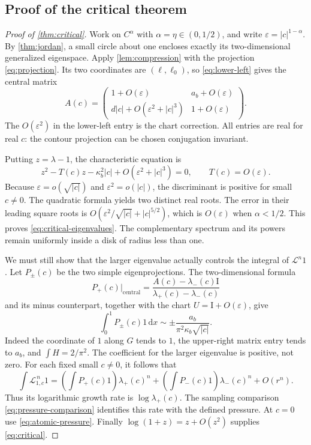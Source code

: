 \documentclass[11pt,a4paper]{article}
\numberwithin{equation}{section}
\theoremstyle{definition}
\theoremstyle{remark}
\newcommand{\dd}{\,\mathrm d}
\newcommand{\Lop}{\mathcal L}
\newcommand{\Id}{\mathrm I}
\begin{document}
\subsection{Proof of the critical theorem}
\begin{proof}[Proof of \cref{thm:critical}]
Work on $C^\alpha$ with $\alpha=\eta\in(0,1/2)$, and write
$\varepsilon=|c|^{1-\alpha}$.
By \cref{thm:jordan}, a small circle about one encloses exactly its
two-dimensional generalized eigenspace. Apply \cref{lem:compression}
with the projection \cref{eq:projection}. Its two coordinates are
$(\ell,\ell_0)$, so \cref{eq:lower-left} gives the central matrix
\begin{equation}
 A(c)=
 \begin{pmatrix}
 1+O(\varepsilon)&a_b+O(\varepsilon)\\
 d|c|+O(\varepsilon^2+|c|^3)&1+O(\varepsilon)
 \end{pmatrix}.
 \label{eq:critical-matrix}
\end{equation}
The $O(\varepsilon^2)$ in the lower-left entry is the chart correction.
All entries are real for real $c$: the contour projection can be chosen
conjugation invariant.

Putting $z=\lambda-1$, the characteristic equation is
\begin{equation}
 z^2-T(c)z-\kappa_b^2|c|
       +O(\varepsilon^2+|c|^3)=0,
 \qquad T(c)=O(\varepsilon).
 \label{eq:critical-characteristic}
\end{equation}
Because $\varepsilon=o(\sqrt{|c|})$ and
$\varepsilon^2=o(|c|)$, the discriminant is positive for small
$c\ne0$. The quadratic formula yields two distinct real roots.
The error in their leading square roots is
$O(\varepsilon^2/\sqrt{|c|}+|c|^{5/2})$, which is
$O(\varepsilon)$ when $\alpha<1/2$. This proves
\cref{eq:critical-eigenvalues}. The complementary spectrum and its
powers remain uniformly inside a disk of radius less than one.

We must still show that the larger eigenvalue actually controls the
integral of $\Lop^n1$. Let $P_\pm(c)$ be the two simple eigenprojections.
The two-dimensional formula
\[
 P_+(c)|_{\mathrm{central}}=
 \frac{A(c)-\lambda_-(c)\Id}{\lambda_+(c)-\lambda_-(c)}
\]
and its minus counterpart, together with the chart
$U=\Id+O(\varepsilon)$, give
\begin{equation}
 \int_0^1P_\pm(c)1\dd x
 \sim \pm\frac{a_b}{\pi^2\kappa_b\sqrt{|c|}}.
 \label{eq:critical-amplitudes}
\end{equation}
Indeed the coordinate of $1$ along $G$ tends to $1$, the upper-right
matrix entry tends to $a_b$, and $\int H=2/\pi^2$.
The coefficient for the larger eigenvalue is positive, not zero.
For each fixed small $c\ne0$, it follows that
\[
 \int\Lop_{1,c}^{\,n}1
 =\left(\int P_+(c)1\right)\lambda_+(c)^n
 +\left(\int P_-(c)1\right)\lambda_-(c)^n+O(r^n).
\]
Thus its logarithmic growth rate is $\log\lambda_+(c)$.
The sampling comparison \cref{eq:pressure-comparison} identifies this
rate with the defined pressure. At $c=0$ use \cref{eq:atomic-pressure}.
Finally $\log(1+z)=z+O(z^2)$ supplies \cref{eq:critical}.
\end{proof}
\end{document}
